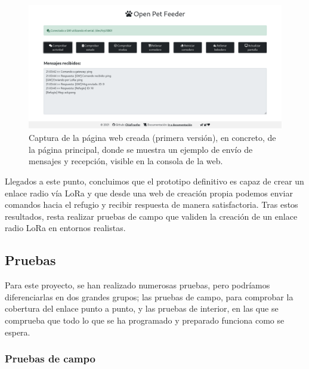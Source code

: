 \documentclass[12pt]{article}
\begin{document}
	
	\begin{figure}[h!]
		\begin{center}
			\includegraphics[width=1\textwidth]{img/captura_web_2.png}
			\caption{Captura de la página web creada (primera versión), en concreto, de la página principal, donde se muestra un ejemplo de envío de mensajes y recepción, visible en la consola de la web.}
			\label{Web: captura ejemplo consola}
		\end{center}
	\end{figure}

	\noindent Llegados a este punto, concluimos que el prototipo definitivo es capaz de crear un enlace radio vía LoRa y que desde una web de creación propia podemos enviar comandos hacia el refugio y recibir respuesta de manera satisfactoria. Tras estos resultados, resta realizar pruebas de campo que validen la creación de un enlace radio LoRa en entornos realistas.\\
	
	\pagebreak
	
	\subsection[Pruebas]{Pruebas}
	
	\noindent Para este proyecto, se han realizado numerosas pruebas, pero podríamos diferenciarlas en dos grandes grupos; las pruebas de campo, para comprobar la cobertura del enlace punto a punto, y las pruebas de interior, en las que se comprueba que todo lo que se ha programado y preparado funciona como se espera. \\
	
	\subsubsection{Pruebas de campo}
	
\end{document}
